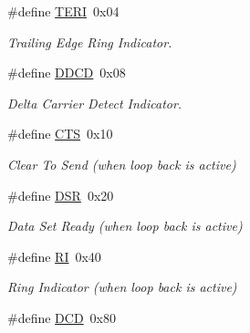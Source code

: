 \begin{DoxyCompactItemize}
\mbox{\label{group__i386__uart_gadd3cb0cb2765504541e9cf0a33231f67}} 
\#define \mbox{\hyperlink{group__i386__uart_gadd3cb0cb2765504541e9cf0a33231f67}{T\+E\+RI}}~0x04
\begin{DoxyCompactList}\small\item\em Trailing Edge Ring Indicator. \end{DoxyCompactList}\item 
\mbox{\label{group__i386__uart_ga3f44d8de622e68c467e2191a5ed2442d}} 
\#define \mbox{\hyperlink{group__i386__uart_ga3f44d8de622e68c467e2191a5ed2442d}{D\+D\+CD}}~0x08
\begin{DoxyCompactList}\small\item\em Delta Carrier Detect Indicator. \end{DoxyCompactList}\item 
\mbox{\label{group__i386__uart_ga9d9ce8cebc572a42e7b4ab9e92c3a350}} 
\#define \mbox{\hyperlink{group__i386__uart_ga9d9ce8cebc572a42e7b4ab9e92c3a350}{C\+TS}}~0x10
\begin{DoxyCompactList}\small\item\em Clear To Send (when loop back is active) \end{DoxyCompactList}\item 
\mbox{\label{group__i386__uart_gaa94aa7be4f567346163b45d1c18ec0a5}} 
\#define \mbox{\hyperlink{group__i386__uart_gaa94aa7be4f567346163b45d1c18ec0a5}{D\+SR}}~0x20
\begin{DoxyCompactList}\small\item\em Data Set Ready (when loop back is active) \end{DoxyCompactList}\item 
\mbox{\label{group__i386__uart_ga7e71def3baefc10ec36f1dd48da4050e}} 
\#define \mbox{\hyperlink{group__i386__uart_ga7e71def3baefc10ec36f1dd48da4050e}{RI}}~0x40
\begin{DoxyCompactList}\small\item\em Ring Indicator (when loop back is active) \end{DoxyCompactList}\item 
\mbox{\label{group__i386__uart_ga45d0e388f3c855ad190ee81d73188584}} 
\#define \mbox{\hyperlink{group__i386__uart_ga45d0e388f3c855ad190ee81d73188584}{D\+CD}}~0x80

\end{DoxyCompactItemize}
